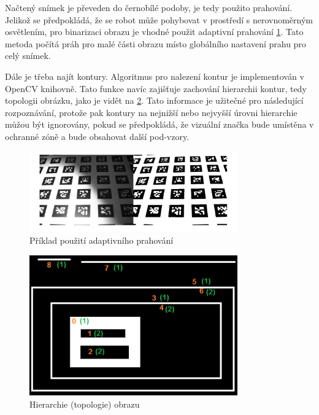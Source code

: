 \documentclass[twoside]{ctuthesis}
\theoremstyle{plain}
\theoremstyle{definition}
\theoremstyle{note}
\begin{document}
Načtený snímek je převeden do černobílé podoby, je tedy použito prahování. Jelikož se předpokládá, že se robot může pohybovat v prostředí s nerovnoměrným osvětlením, pro binarizaci obrazu je vhodné použit adaptivní prahování \ref{adapt}. Tato metoda počítá práh pro malé části obrazu místo globálního nastavení prahu pro celý snímek.

Dále je třeba najít kontury. Algoritmus pro nalezení kontur je implementován v OpenCV knihovně. Tato funkce navíc zajišťuje zachování hierarchii kontur, tedy topologii obrázku, jako je vidět na \ref{hierarch}. Tato informace je užitečné pro následující rozpoznávání, protože pak kontury na nejnižší nebo nejvyšší úrovni hierarchie můžou být ignorovány, pokud se předpokládá, že vizuální značka bude umístěna v ochranné zóně a bude obsahovat další pod-vzory.

\begin{figure}
	\caption{Příklad použití adaptivního prahování}
	
	\label{adapt}
	\includegraphics[width=0.8\textwidth]{images/2/adapt.jpg}
\end{figure}

\begin{figure}
	
	\caption{Hierarchie (topologie) obrazu}
	
	\label{hierarch}
	\includegraphics[width=0.8\textwidth]{images/2/ccomp_hierarchy.png}
\end{figure}
\end{document}
